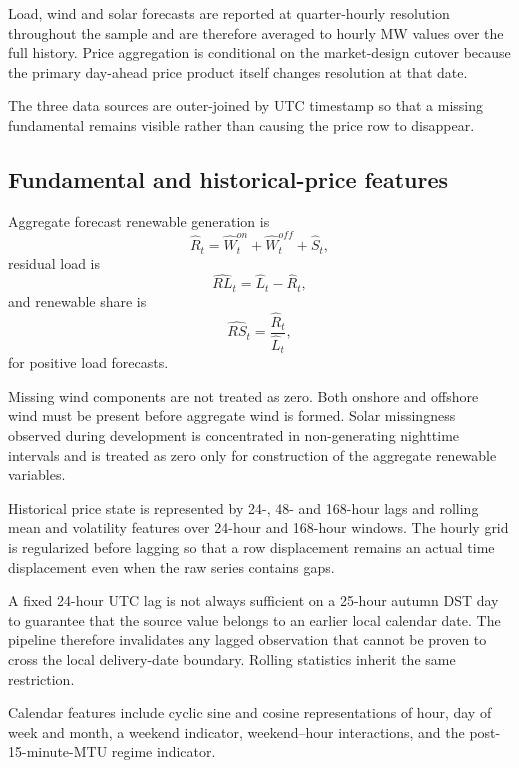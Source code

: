 Load, wind and solar forecasts are reported at quarter-hourly resolution throughout the sample and are therefore averaged to hourly MW values over the full history. Price aggregation is conditional on the market-design cutover because the primary day-ahead price product itself changes resolution at that date.

The three data sources are outer-joined by UTC timestamp so that a missing fundamental remains visible rather than causing the price row to disappear.

\subsection{Fundamental and historical-price features}

Aggregate forecast renewable generation is
\begin{equation}
\widehat R_t=
\widehat W_t^{on}+\widehat W_t^{off}+\widehat S_t,
\end{equation}
residual load is
\begin{equation}
\widehat{RL}_t=\widehat L_t-\widehat R_t,
\end{equation}
and renewable share is
\begin{equation}
\widehat{RS}_t=\frac{\widehat R_t}{\widehat L_t},
\end{equation}
for positive load forecasts.

Missing wind components are not treated as zero. Both onshore and offshore wind must be present before aggregate wind is formed. Solar missingness observed during development is concentrated in non-generating nighttime intervals and is treated as zero only for construction of the aggregate renewable variables.

Historical price state is represented by 24-, 48- and 168-hour lags and rolling mean and volatility features over 24-hour and 168-hour windows. The hourly grid is regularized before lagging so that a row displacement remains an actual time displacement even when the raw series contains gaps.

A fixed 24-hour UTC lag is not always sufficient on a 25-hour autumn DST day to guarantee that the source value belongs to an earlier local calendar date. The pipeline therefore invalidates any lagged observation that cannot be proven to cross the local delivery-date boundary. Rolling statistics inherit the same restriction.

Calendar features include cyclic sine and cosine representations of hour, day of week and month, a weekend indicator, weekend--hour interactions, and the post-15-minute-MTU regime indicator.

